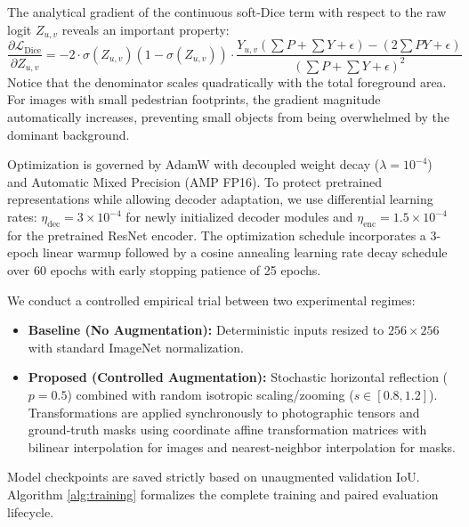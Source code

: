\documentclass[10pt,a4paper]{article}
\begin{document}
The analytical gradient of the continuous soft-Dice term with respect to the raw logit $Z_{u,v}$ reveals an important property:
\begin{equation}
    \frac{\partial \mathcal{L}_{\text{Dice}}}{\partial Z_{u,v}} = -2 \cdot \sigma(Z_{u,v})(1 - \sigma(Z_{u,v})) \cdot \frac{Y_{u,v}\left(\sum P + \sum Y + \epsilon\right) - \left(2\sum P Y + \epsilon\right)}{\left(\sum P + \sum Y + \epsilon\right)^2}
    \label{eq:dice_gradient}
\end{equation}
Notice that the denominator scales quadratically with the total foreground area. For images with small pedestrian footprints, the gradient magnitude automatically increases, preventing small objects from being overwhelmed by the dominant background.

Optimization is governed by AdamW with decoupled weight decay ($\lambda = 10^{-4}$) and Automatic Mixed Precision (AMP FP16). To protect pretrained representations while allowing decoder adaptation, we use differential learning rates: $\eta_{\text{dec}} = 3 \times 10^{-4}$ for newly initialized decoder modules and $\eta_{\text{enc}} = 1.5 \times 10^{-4}$ for the pretrained ResNet encoder. The optimization schedule incorporates a 3-epoch linear warmup followed by a cosine annealing learning rate decay schedule over 60 epochs with early stopping patience of 25 epochs.

We conduct a controlled empirical trial between two experimental regimes:
\begin{itemize}
    \item \textbf{Baseline (No Augmentation):} Deterministic inputs resized to $256 \times 256$ with standard ImageNet normalization.
    \item \textbf{Proposed (Controlled Augmentation):} Stochastic horizontal reflection ($p=0.5$) combined with random isotropic scaling/zooming ($s \in [0.8, 1.2]$). Transformations are applied synchronously to photographic tensors and ground-truth masks using coordinate affine transformation matrices with bilinear interpolation for images and nearest-neighbor interpolation for masks.
\end{itemize}
Model checkpoints are saved strictly based on unaugmented validation IoU. Algorithm \ref{alg:training} formalizes the complete training and paired evaluation lifecycle.
\end{document}
